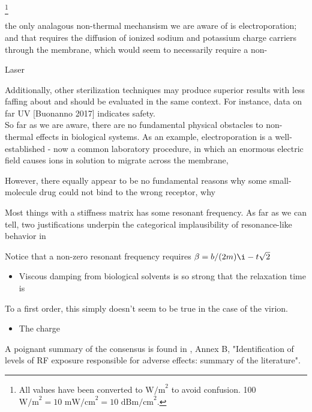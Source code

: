 \documentclass[paper.tex]{subfiles}
\begin{document}
\footnote{All values have been converted to $\text{W/m}^2$ to avoid confusion. 100 $\text{W/m}^2 = 10 \text{ mW/cm}^2 = 10 \text{ dBm/cm}^2$.}




the only analagous non-thermal mechansism we are aware of is electroporation; and that requires the diffusion of ionized sodium and potassium charge carriers through the membrane, which would seem to necessarily require a non-

Laser


Additionally, other sterilization techniques may produce superior results with less faffing about and should be evaluated in the same context. For instance, data on far UV [Buonanno 2017] indicates safety.\\


So far as we are aware, there are no fundamental physical obstacles to non-thermal effects in biological systems. As an example, electroporation is a well-established - now a common laboratory procedure, in which an enormous electric field causes ions in solution to migrate across the membrane, 

However, there equally appear to be no fundamental reasons why some small-molecule drug could not bind to the wrong receptor, why 



Most things with a stiffness matrix has some resonant frequency\citationneeded. As far as we can tell, two justifications underpin the categorical implausibility of resonance-like behavior in 

Notice that a non-zero resonant frequency
requires $\beta = b/(2m) \i-t \sqrt{2}$ \cite{Driven}


\begin{itemize}
		\item Viscous damping from biological solvents is so strong that the relaxation time is 
\end{itemize}

To a first order, this simply doesn't seem to be true in the case of the virion.

\begin{itemize}
		\item The charge 
\end{itemize}








A poignant summary of the consensus is found in \cite{IEEE2006}, Annex B, "Identification of levels of RF exposure responsible for adverse effects: summary of the literature".
\end{document}
